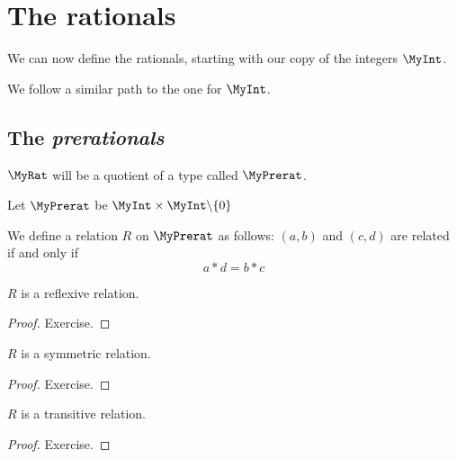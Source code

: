 \chapter{The rationals}

We can now define the rationals, starting with our copy of the integers $\MyInt$.

We follow a similar path to the one for $\MyInt$.

\section{The \emph{prerationals}}

$\MyRat$ will be a quotient of a type called $\MyPrerat$.

\begin{definition}
    \label{MyPrerat}
    \leanok
    Let $\MyPrerat$ be $\MyInt \times \MyInt \backslash \{0\}$
\end{definition}

\begin{definition}
    \label{MyPrerat.R}
    \leanok
We define a relation $R$ on $\MyPrerat$ as follows: $(a,b)$ and $(c, d)$ are related if and only if
\[
a * d = b * c
\]
\end{definition}

\begin{lemma}
$R$ is a reflexive relation.
    \label{MyPrerat.R_refl}
    \leanok
\end{lemma}
\begin{proof}
    \leanok
    Exercise.
\end{proof}

\begin{lemma}
$R$ is a symmetric relation.
    \label{MyPrerat.R_symm}
    \leanok
\end{lemma}
\begin{proof}
    \leanok
    Exercise.
\end{proof}

\begin{lemma}
$R$ is a transitive relation.
    \label{MyPrerat.R_trans}
    \leanok
\end{lemma}
\begin{proof}
    \leanok
    Exercise.
\end{proof}

